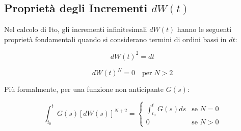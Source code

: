 \subsection{Proprietà degli Incrementi $dW(t)$}
Nel calcolo di Ito, gli incrementi infinitesimali $dW(t)$ hanno le seguenti proprietà fondamentali quando si considerano termini di ordini bassi in $dt$:
\begin{tcolorbox}[colback=colorA!5,colframe=colorA]
\begin{equation} dW(t)^2 = dt \end{equation}
\end{tcolorbox}
\begin{tcolorbox}[colback=colorA!5,colframe=colorA]
\begin{equation} dW(t)^{N} = 0 \quad \text{per} \; N>2\end{equation}
\end{tcolorbox}
Più formalmente, per una funzione non anticipante $G(s)$:
\begin{tcolorbox}[colback=colorA!5,colframe=colorA]
\begin{equation}
\int_{t_0}^{t} G(s) [dW(s)]^{N+2} = \begin{cases} \int_{t_0}^{t} G(s) ds & \text{se } N=0 \\ 0 & \text{se } N>0 \end{cases}
\end{equation}
\end{tcolorbox}
